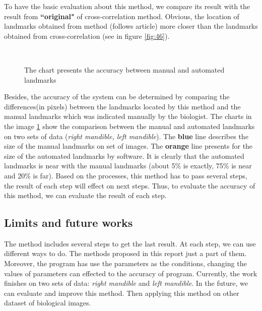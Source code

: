 To have the basic evaluation about this method, we compare its result with the result from \textbf{``original"} of cross-correlation method. Obvious, the location of landmarks obtained from method (follows article) more closer than the landmarks obtained from cross-correlation (see in figure \ref{fig:46}).\\
\begin{figure}[h!]
\centering
{}~~
\caption{The chart presents the accuracy between manual and automated landmarks}
\label{fig:47}
\end{figure}
Besides, the accuracy of the system can be determined by comparing the differences(in pixels) between the landmarks located by this method and the manual landmarks which was indicated manually by the biologist. The charts in the image \ref{fig:47} show the comparison between the manual and automated landmarks on two sets of data (\textit{right mandible, left mandible}). The \textbf{blue} line describes the size of the manual landmarks on set of images. The \textbf{orange} line presents for the size of the automated landmarks by software. It is clearly that the automated landmarks is near with the manual landmarks (about 5\% is exactly, 75\% is near and 20\% is far). Based on the processes, this method has to pass several steps, the result of each step will effect on next steps. Thus, to evaluate the accuracy of this method, we can evaluate the result of each step.
\subsection{Limits and future works}
The method includes several steps to get the last result. At each step, we can use different ways to do. The methods proposed in this report just a part of them. Moreover, the program has use the parameters as the conditions, changing the values of parameters can effected to the accuracy of program.
Currently, the work finishes on two sets of data: \textit{right mandible} and \textit{left mandible}. In the future, we can evaluate and improve this method. Then applying this method on other dataset of biological images.